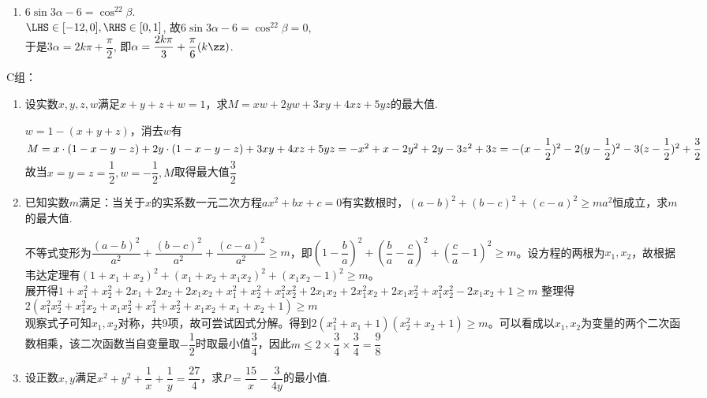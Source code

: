\begin{enumerate}
\begin{jieda}
\begin{enumerate}
\item $6\sin3\alpha-6=\cos^22\beta$. \\
$\LHS\in[-12,0],\RHS\in[0,1]$, 故$6\sin3\alpha-6=\cos^22\beta=0$, \\
于是$3\alpha=2k\pi+\dfrac{\pi}{2}$, 即$\alpha=\dfrac{2k\pi}{3}+\dfrac{\pi}{6}(k\zz)$. 
\end{enumerate}
\end{jieda}

\end{enumerate}

C组：
\begin{enumerate}
    \item 设实数$x, y, z, w$满足$x+y+z+w = 1$，求$M = xw + 2yw + 3xy + 4xz + 5yz$的最大值.
    \begin{jieda}
        $w = 1 - (x+y+z)$，消去$w$有$M = x\cdot(1-x-y-z) + 2y \cdot (1-x-y-z) + 3xy  + 4xz + 5yz \\ = -x^2 + x - 2y^2 + 2y - 3z^2 + 3z = -(x-\dfrac{1}{2})^2 - 2(y - \dfrac{1}{2})^2 - 3(z - \dfrac{1}{2})^2 + \dfrac{3}{2}$ \\
        故当$x = y = z = \dfrac{1}{2}, w = -\dfrac{1}{2}, M$取得最大值$\dfrac{3}{2}$
    \end{jieda}
    \item 已知实数$m$满足：当关于$x$的实系数一元二次方程$ax^2+bx+c=0$有实数根时，$(a-b)^2+(b-c)^2+(c-a)^2 \geq ma^2$恒成立，求$m$的最大值.
    \begin{jieda}
        不等式变形为$\dfrac{(a-b)^2}{a^2}+\dfrac{(b-c)^2}{a^2}+\dfrac{(c-a)^2}{a^2} \geq m$，即$(1-\dfrac{b}{a})^2 + (\dfrac{b}{a} - \dfrac{c}{a})^2 + (\dfrac{c}{a} - 1)^2 \geq m$。设方程的两根为$x_1, x_2$，故根据韦达定理有$(1+x_1+x_2)^2 + (x_1+x_2+x_1x_2)^2 + (x_1x_2-1)^2 \geq m$。\\
        展开得$1+x_1^2+x_2^2+2x_1 + 2x_2+2x_1x_2 + x_1^2 + x_2^2 + x_1^2x_2^2 + 2x_1x_2 + 2x_1^2x_2 + 2x_1x_2^2 + x_1^2x_2^2 -2x_1x_2 + 1 \geq m$
        整理得$2(x_1^2x_2^2 + x_1^2x_2 + x_1x_2^2 + x_1^2 + x_2^2 + x_1x_2 + x_1 + x_2 + 1) \geq m$ \\
        观察式子可知$x_1, x_2$对称，共9项，故可尝试因式分解。得到$2(x_1^2 + x_1 + 1)(x_2^2 + x_2 + 1) \geq m$。可以看成以$x_1, x_2$为变量的两个二次函数相乘，该二次函数当自变量取$-\dfrac{1}{2}$时取最小值$\dfrac{3}{4}$，因此$m \leq 2 \times \dfrac{3}{4} \times \dfrac{3}{4} = \dfrac{9}{8}$
    \end{jieda}
    \item 设正数$x, y$满足$x^2+y^2+\dfrac{1}{x} + \dfrac{1}{y} = \dfrac{27}{4}$，求$P = \dfrac{15}{x} - \dfrac{3}{4y}$的最小值.

\end{enumerate}

